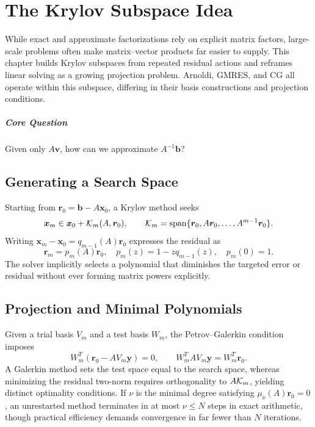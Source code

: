 \chapter{The Krylov Subspace Idea}\label{v0ch:10}
\begin{chaptersummary}
While exact and approximate factorizations rely on explicit matrix factors, large-scale problems often make matrix--vector products far easier to supply. This chapter builds Krylov subspaces from repeated residual actions and reframes linear solving as a growing projection problem. Arnoldi, GMRES, and CG all operate within this subspace, differing in their basis constructions and projection conditions.
\end{chaptersummary}
\paragraph{Core Question}Given only $A\bm v$, how can we approximate $A^{-1}\bm b$?

\section{Generating a Search Space}
Starting from $\bm r_0=\bm b-A\bm x_0$, a Krylov method seeks
\[
 \bm x_m\in\bm x_0+\mathcal K_m(A,\bm r_0),\qquad
 \mathcal K_m=\operatorname{span}\{\bm r_0,A\bm r_0,\ldots,A^{m-1}\bm r_0\}.
\]
Writing $\bm x_m-\bm x_0=q_{m-1}(A)\bm r_0$ expresses the residual as
\[
 \bm r_m=p_m(A)\bm r_0,\quad
 p_m(z)=1-zq_{m-1}(z),\quad p_m(0)=1.
\]
The solver implicitly selects a polynomial that diminishes the targeted error or residual without ever forming matrix powers explicitly.
\section{Projection and Minimal Polynomials}
Given a trial basis $V_m$ and a test basis $W_m$, the Petrov--Galerkin condition imposes
\[
 W_m^T(\bm r_0-AV_m\bm y)=0,\qquad
 W_m^TAV_m\bm y=W_m^T\bm r_0.
\]
A Galerkin method sets the test space equal to the search space, whereas minimizing the residual two-norm requires orthogonality to $A\mathcal K_m$, yielding distinct optimality conditions.
If $\nu$ is the minimal degree satisfying $\mu_\nu(A)\bm r_0=0$, an unrestarted method terminates in at most $\nu\le N$ steps in exact arithmetic, though practical efficiency demands convergence in far fewer than $N$ iterations.
